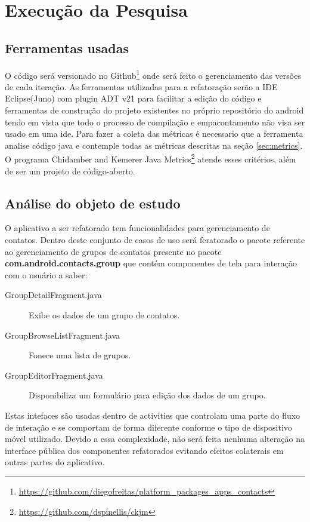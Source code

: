 \chapter{Execução da Pesquisa}


\section{Ferramentas usadas}

O código será versionado no
Github\footnote{\url{https://github.com/diegofreitas/platform_packages_apps_contacts}}
onde será feito o gerenciamento das versões de cada iteração.
As ferramentas utilizadas para a refatoração serão a IDE Eclipse(Juno) com
plugin ADT v21 para facilitar a edição do código e ferramentas de construção
do projeto existentes no próprio repositório do android tendo em vista que todo
o processo de compilação e empacontamento não visa ser usado em uma ide.
Para fazer a coleta das métricas é necessario que a ferramenta analise código
java e contemple todas as métricas descritas na seção \ref{sec:metrics}. O
programa Chidamber and Kemerer Java
Metrics\footnote{\url{https://github.com/dspinellis/ckjm}} atende esses
critérios, além de ser um projeto de código-aberto.

\section{Análise do objeto de estudo}

O aplicativo a ser refatorado tem funcionalidades para gerenciamento de
contatos. Dentro deste conjunto de casos de uso será feratorado o pacote
referente ao gerenciamento de grupos de contatos presente no pacote
\textbf{com.android.contacts.group} que contém componentes de tela para
interação com o usuário a saber:
\begin{description}
\item[GroupDetailFragment.java] Exibe os dados de um grupo de contatos.
\item[GroupBrowseListFragment.java] Fonece uma lista de grupos.
\item[GroupEditorFragment.java] Disponibiliza um formulário para edição dos
dados de um grupo.
\end{description}

Estas intefaces são usadas dentro de activities que controlam uma parte do fluxo
de interação e se comportam de forma diferente conforme o tipo de dispositivo
móvel utilizado. Devido a essa complexidade, não será feita nenhuma alteração na
interface pública dos componentes refatorados evitando efeitos colaterais em
outras partes do aplicativo.

